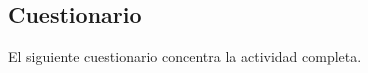 \documentclass[
	spanish,
	letterpaper, oneside
]{article}
\begin{document}
\subsection{Cuestionario}

El siguiente cuestionario concentra la actividad completa.

%
%
%
\end{document}
